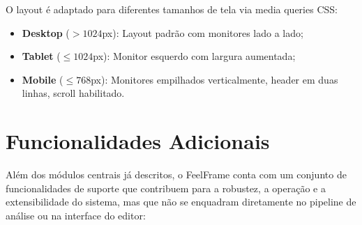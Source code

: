 \documentclass[
	12pt,
	openright,
	oneside,
	a4paper,
	english,
	brazil
	]{abntex2}
\begin{document}
O layout é adaptado para diferentes tamanhos de tela via media queries CSS:
\begin{itemize}
    \item \textbf{Desktop} ($> 1024$px): Layout padrão com monitores lado a lado;
    \item \textbf{Tablet} ($\leq 1024$px): Monitor esquerdo com largura aumentada;
    \item \textbf{Mobile} ($\leq 768$px): Monitores empilhados verticalmente, header em duas linhas, scroll habilitado.
\end{itemize}

\section{Funcionalidades Adicionais}

Além dos módulos centrais já descritos, o FeelFrame conta com um conjunto de funcionalidades de suporte que contribuem para a robustez, a operação e a extensibilidade do sistema, mas que não se enquadram diretamente no pipeline de análise ou na interface do editor:
\end{document}
